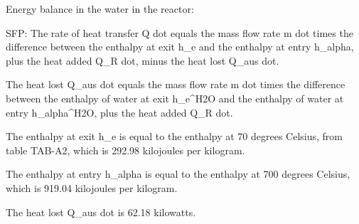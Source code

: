 Energy balance in the water in the reactor:

SFP: The rate of heat transfer Q dot equals the mass flow rate m dot times the difference between the enthalpy at exit h_e and the enthalpy at entry h_alpha, plus the heat added Q_R dot, minus the heat lost Q_aus dot.

The heat lost Q_aus dot equals the mass flow rate m dot times the difference between the enthalpy of water at exit h_e^H2O and the enthalpy of water at entry h_alpha^H2O, plus the heat added Q_R dot.

The enthalpy at exit h_e is equal to the enthalpy at 70 degrees Celsius, from table TAB-A2, which is 292.98 kilojoules per kilogram.

The enthalpy at entry h_alpha is equal to the enthalpy at 700 degrees Celsius, which is 919.04 kilojoules per kilogram.

The heat lost Q_aus dot is 62.18 kilowatts.